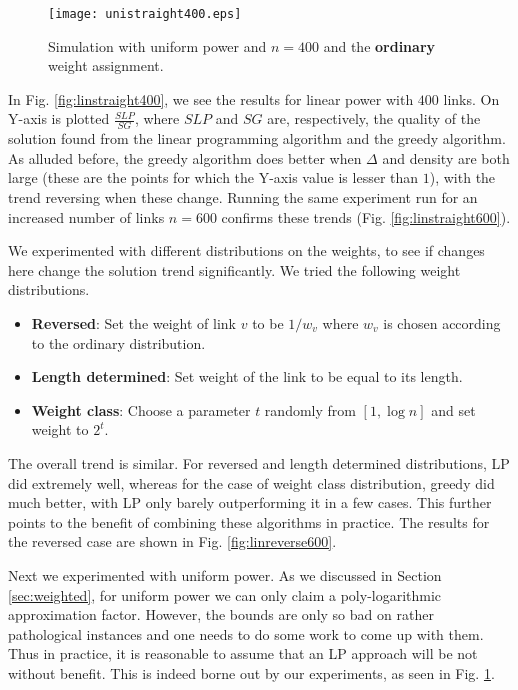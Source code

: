 \documentclass[11pt]{amsart}
\begin{document}
\begin{figure}
\begin{center}
\texttt{[image: unistraight400.eps]}
\caption{Simulation with uniform power and $n = 400$ and the {\bf ordinary} weight assignment. } 
\label{fig:unistraight400}
\end{center}
\end{figure}


In Fig. \ref{fig:linstraight400}, we see the results for linear power with $400$ links. On Y-axis is plotted $\frac{SLP}{SG}$, where
$SLP$ and $SG$ are, respectively, the quality of the solution found from the linear programming algorithm and the greedy algorithm.
As alluded before, the greedy algorithm does better when $\Delta$ and density are both large (these are the points for which the Y-axis value is lesser than $1$), with the trend reversing when these change. 
Running the same experiment run for an increased number of links $n = 600$ confirms these trends (Fig. \ref{fig:linstraight600}).

We experimented with different distributions on the weights, to see if changes here change the solution trend significantly. We tried the following weight distributions.

\begin{itemize}
\item {\bf Reversed}: Set the weight of link $v$ to be $1/w_v$ where $w_v$ is chosen according to the ordinary distribution.
\item {\bf Length determined}: Set weight of the link to be equal to its length.
\item {\bf Weight class}: Choose a parameter $t$ randomly from $[1, \log n]$ and set weight to $2^t$.
\end{itemize}
The overall trend is similar. For reversed and  length determined distributions, LP did extremely well, whereas for the case
of weight class distribution, greedy did much better, with LP only barely outperforming it in a few cases. This further points to
the benefit of combining these algorithms in practice. The results for the reversed case are shown in Fig. \ref{fig:linreverse600}.

Next we experimented with uniform power. As we discussed in Section \ref{sec:weighted}, for uniform power we can only claim a poly-logarithmic approximation factor. However, the bounds are only so bad on rather pathological instances and one needs to do some work to come up with them. Thus in practice, it is reasonable to assume that an LP approach will be not without benefit.
  This is indeed borne out by our experiments, as seen in Fig. \ref{fig:unistraight400}.
\end{document}
